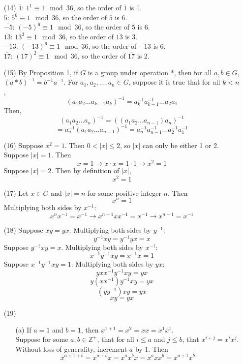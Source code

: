 \documentclass[12pt]{article}
\begin{document}
\begin{itemize}
\item[(14)]
$\overline{1}$: $1^1 \equiv 1 \mod 36$, so the order of $\overline{1}$ is 1. \\
$\overline{5}$: $5^6 \equiv 1 \mod 36$, so the order of $\overline{5}$ is 6. \\
$\overline{-5}$: $(-5)^6 \equiv 1 \mod 36$, so the order of $\overline{5}$ is 6. \\
$\overline{13}$: $13^3 \equiv 1 \mod 36$, so the order of $\overline{13}$ is 3. \\
$\overline{-13}$: $(-13)^6 \equiv 1 \mod 36$, so the order of $\overline{-13}$ is 6. \\
$\overline{17}$: $(17)^2 \equiv 1 \mod 36$, so the order of $\overline{17}$ is 2.
\item[(15)]
By Proposition 1, if $G$ is a group under operation *, then for all $a, b \in G$, $(a * b)^{-1} = b^{-1}a^{-1}$. For $a_1, a_2, ..., a_n \in G$, suppose it is true that for all $k < n$,
$$(a_1a_2...a_{k-1}a_k)^{-1} = a_k^{-1}a_{k-1}^{-1}...a_2a_1$$
Then,
$$(a_1a_2...a_n)^{-1} = ((a_1a_2...a_{n-1})a_n)^{-1}$$ 
$$= a_n^{-1}(a_1a_2...a_{n-1})^{-1} = a_n^{-1}a_{n-1}^{-1}...a_2^{-1}a_1^{-1}$$
\item[(16)]
Suppose $x^2 = 1$. Then $0 < |x| \leq 2$, so $|x|$ can only be either 1 or 2. \\
Suppose $|x| = 1$. Then 
$$x = 1 \rightarrow x \cdot x = 1 \cdot 1 \rightarrow x^2 = 1$$
Suppose $|x| = 2$. Then by definition of $|x|$,
$$x^2 = 1$$
\item[(17)]
Let $x \in G$ and $|x| = n$ for some positive integer $n$. Then
$$x^n = 1$$
Multiplying both sides by $x^{-1}$:
$$x^nx^{-1} = x^{-1} \rightarrow x^{n-1}xx^{-1} = x^{-1} \rightarrow x^{n-1} = x^{-1}$$
\item[(18)]
Suppose $xy = yx$. Multiplying both sides by $y^{-1}$:
$$y^{-1}xy = y^{-1}yx = x$$
Suppose $y^{-1}xy = x$. Multiplying both sides by $x^{-1}$:
$$x^{-1}y^{-1}xy = x^{-1}x = 1$$
Suppose $x^{-1}y^{-1}xy = 1$. Multiplying both sides by $yx$:
$$yxx^{-1}y^{-1}xy = yx$$
$$y(xx^{-1})y^{-1}xy = yx$$
$$(yy^{-1})xy = yx$$
$$xy = yx$$
\item[(19)]
\begin{itemize}
\item[(a)]
If $a = 1$ and $b = 1$, then $x^{1 + 1} = x^2 = xx = x^1x^1$. \\
Suppose for some $a, b \in \mathbb{Z}^+$, that for all $i \leq a$ and $j \leq b$, that $x^{i + j} = x^ix^j$. Without loss of generality, increment $a$ by 1. Then
$$x^{a + 1 + b} = x^{a + b}x = x^ax^bx = x^axx^b = x^{a + 1}x^b$$

\end{itemize}
\end{itemize}
\end{document}
